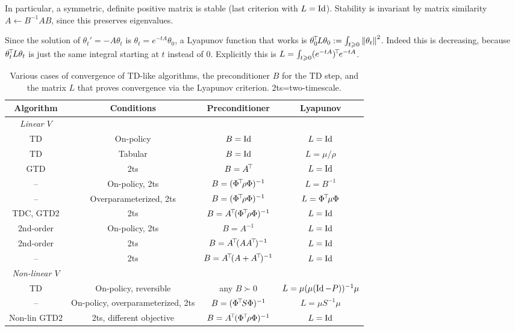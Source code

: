 \documentclass[11pt,a4paper]{article}
\begin{document}
In particular, a symmetric, definite positive matrix is stable (last
criterion with $L=\operatorname{Id}$).
Stability is invariant by matrix similarity $A\gets B^{-1}A B$, since
this preserves eigenvalues.

Since the
solution of $\theta_t'=-A\theta_t$ is $\theta_t=e^{-tA}\theta_0$, a
Lyapunov function that works is $\theta_0^{\!\top}\!L\theta_0\mathrel{\mathop{:}}= \int_{t \geqslant 0}
\left\lVert\theta_t\right\rVert^2$. Indeed this is decreasing, because
$\theta_t^{\!\top}\!L\theta_t$ is just the same integral starting at $t$
instead of $0$. Explicitly this is
$L=\int_{t\geqslant 0} (e^{-t A})^{\!\top}\!
e^{-tA}$.


\begin{table}
\begin{tabular}{cccc}
Algorithm & Conditions & Preconditioner & Lyapunov
\\
\hline
\emph{Linear $V$} \\
TD	& On-policy & $B=\operatorname{Id}$ & $L=\operatorname{Id}$ \\
TD & Tabular & $B=\operatorname{Id}$ & $L=\mu/\rho$ \\
GTD & 2ts & $B=A^{\!\top}\!$ & $L=\operatorname{Id}$\\
– & On-policy, 2ts & $B=(\Phi^{\!\top}\!\rho\Phi)^{-1}$ & $L=B^{-1}$ \\
– & Overparameterized, 2ts & $B=(\Phi^{\!\top}\!\rho\Phi)^{-1}$ &
$L=\Phi^{\!\top}\!\mu\Phi$ \\
TDC, GTD2 & 2ts & $B=A^{\!\top}\!(\Phi^{\!\top}\!\rho\Phi)^{-1}$ &
$L=\operatorname{Id}$ \\
2nd-order & On-policy, 2ts & $B=A^{-1}$ & $L=\operatorname{Id}$\\
2nd-order & 2ts & $B=A^{\!\top}\!(AA^{\!\top}\!)^{-1}$ & $L=\operatorname{Id}$\\
– & 2ts & $B=A^{\!\top}\!(A+A^{\!\top}\!)^{-1}$ & $L=\operatorname{Id}$\\
\hline
\emph{Non-linear $V$} \\
TD & On-policy, reversible & any $B\succ 0$ & $L=\mu(\mu(\operatorname{Id}-P))^{-1}\mu$
\\
– & On-policy, overparameterized, 2ts & $B=(\Phi^{\!\top}\!S\Phi)^{-1}$ &
$L= \mu S^{-1} \mu$ \\
Non-lin GTD2 & 2ts, different objective &
$B=A^{\!\top}\!(\Phi^{\!\top}\!\rho\Phi)^{-1}$  & $L=\operatorname{Id}$
\\\hline
\end{tabular}
\label{tab:TDlist}
\caption{Various cases of convergence of TD-like algorithms, the
preconditioner $B$ for the TD step, and the matrix $L$ that proves
convergence via the Lyapunov criterion. 2ts=two-timescale.}
\end{table}
\end{document}
